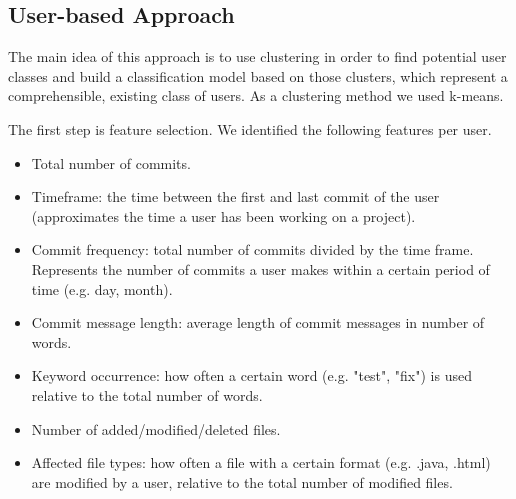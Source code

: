 \subsection{User-based Approach}

The main idea of this approach is to use clustering in order to find potential user classes and build a classification model based on those clusters, which represent a comprehensible, existing class of users. As a clustering method we used k-means.

The first step is feature selection. We identified the following features per user.

\begin{itemize}

\item Total number of commits.

\item Timeframe: the time between the first and last commit of the user (approximates the time a user has been working on a project).

\item Commit frequency: total number of commits divided by the time frame. Represents the number of commits a user makes within a certain period of time (e.g. day, month).

\item Commit message length: average length of commit messages in number of words.

\item Keyword occurrence: how often a certain word (e.g. "test", "fix") is used relative to the total number of words.

\item Number of added/modified/deleted files.

\item Affected file types: how often a file with a certain format (e.g. .java, .html) are modified by a user, relative to the total number of modified files.

\end{itemize}




